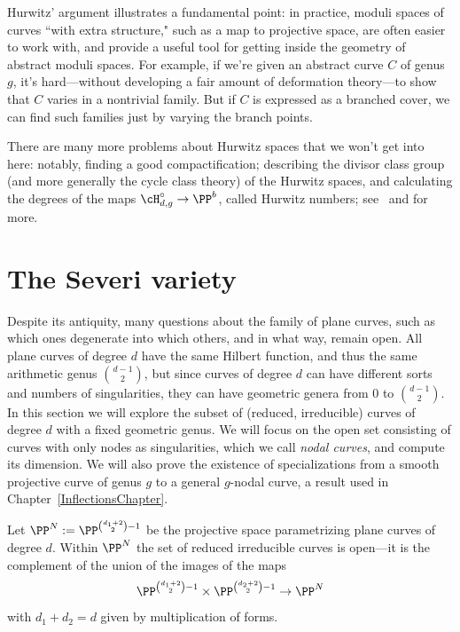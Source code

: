 Hurwitz' argument illustrates a fundamental point: in practice, moduli spaces of curves ``with extra structure," such as a map to projective space, are often easier to work with, and provide a useful tool for getting inside the geometry of abstract moduli spaces. For example, if we're given an abstract curve $C$ of genus $g$, it's hard---without developing a fair amount of deformation theory---to show that $C$ varies in a nontrivial family. But if $C$ is expressed as a branched cover, we can find such families just by varying the branch points.

There are many more problems about Hurwitz spaces that we won't get into here: notably, finding a good compactification; describing the divisor class group (and more generally the cycle class theory) of the Hurwitz spaces, and calculating the degrees of the maps $\cH^\circ_{d,g} \to \PP^b$, called Hurwitz numbers; see~\cite{Hurwitz2} and \cite{ELSV} for more.

\section{The Severi variety}\label{severi variety}

Despite its antiquity, many questions about the family of plane curves, such as which ones degenerate into which others, and in what way, remain open. All plane curves of degree $d$ have the same Hilbert function, and thus the same arithmetic genus
$\binom{d-1}{2}$, but since curves of degree $d$ can have different sorts and numbers of singularities, they can have geometric genera from 0 to $\binom{d-1}{2}$. In this section we will explore the subset of (reduced, irreducible) curves of degree $d$ with a fixed geometric genus. We will focus on the open set consisting of curves with only nodes as singularities, which we call \emph{nodal curves}, and compute its dimension. We will also prove the existence of specializations from a smooth projective curve of genus $g$ to a general $g$-nodal curve, a result used in Chapter~\ref{InflectionsChapter}.

\def\Vdg{{V_{d,g}}}
\def\Vdgbar{{\overline{V}_{d,g}}} 

Let $\PP^N := \PP^{{d_1+2\choose 2} - 1}$ be the projective space parametrizing plane curves of degree $d$.
Within $\PP^N$ the set of reduced irreducible curves is open---it is the complement of the union of the images of the maps 
$$
\PP^{{d_1+2\choose 2} - 1}\times\PP^{{d_2+2\choose 2}-1} \to \PP^N
$$ 
with $d_1+d_2 = d$ given by multiplication of forms. 

